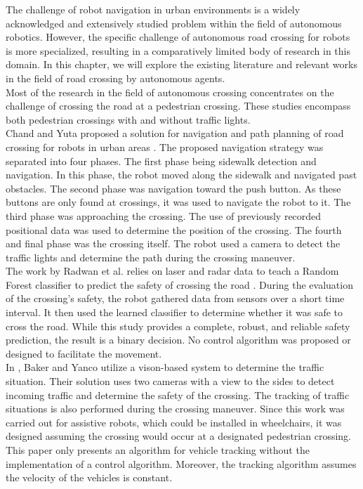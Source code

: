 The challenge of robot navigation in urban environments is a widely acknowledged and extensively studied problem within the field of autonomous robotics. However, the specific challenge of autonomous road crossing for robots is more specialized, resulting in a comparatively limited body of research in this domain. In this chapter, we will explore the existing literature and relevant works in the field of road crossing by autonomous agents.\\
Most of the research in the field of autonomous crossing concentrates on the challenge of crossing the road at a pedestrian crossing. These studies encompass both pedestrian crossings with and without traffic lights.\\
Chand and Yuta proposed a solution for navigation and path planning of road crossing for robots in urban areas \cite{Chand}. The proposed navigation strategy was separated into four phases. The first phase being sidewalk detection and navigation. In this phase, the robot moved along the sidewalk and navigated past obstacles. The second phase was navigation toward the push button. As these buttons are only found at crossings, it was used to navigate the robot to it. The third phase was approaching the crossing. The use of previously recorded positional data was used to determine the position of the crossing. The fourth and final phase was the crossing itself. The robot used a camera to detect the traffic lights and determine the path during the crossing maneuver.\\
The work by Radwan et al. relies on laser and radar data to teach a Random Forest classifier to predict the safety of crossing the road \cite{Radwan}. During the evaluation of the crossing's safety, the robot gathered data from sensors over a short time interval. It then used the learned classifier to determine whether it was safe to cross the road. While this study provides a complete, robust, and reliable safety prediction, the result is a binary decision. No control algorithm was proposed or designed to facilitate the movement.\\
In \cite{Baker}, Baker and Yanco utilize a vison-based system to determine the traffic situation. Their solution uses two cameras with a view to the sides to detect incoming traffic and determine the safety of the crossing. The tracking of traffic situations is also performed during the crossing maneuver. Since this work was carried out for assistive robots, which could be installed in wheelchairs, it was designed assuming the crossing would occur at a designated pedestrian crossing. This paper only presents an algorithm for vehicle tracking without the implementation of a control algorithm. Moreover, the tracking algorithm assumes the velocity of the vehicles is constant.\\\\
